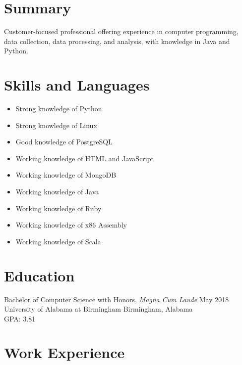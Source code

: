 \documentclass[10pt]{setzer_resume}
\begin{document}


  \section{Summary}
  Customer-focused professional offering experience in computer programming, data collection, data processing, and analysis, with knowledge in Java and Python.

  \section{Skills and Languages}

  {
  \setlength\multicolsep{0pt}
  \begin{multicols}{2}
    \noindent
    \begin{itemize}[nosep]
      \item Strong knowledge of Python
      \item Strong knowledge of Linux
      \item Good knowledge of PostgreSQL
      \item Working knowledge of HTML and JavaScript
      \item Working knowledge of MongoDB
      \item Working knowledge of Java
      \item Working knowledge of Ruby
      \item Working knowledge of x86 Assembly
      \item Working knowledge of Scala
    \end{itemize}
  \end{multicols}
  }

  \section{Education}
  Bachelor of Computer Science with Honors, \textit{Magna Cum Laude} \hfill May 2018 \\
  University of Alabama at Birmingham \hfill Birmingham, Alabama \\
  GPA\@: 3.81

  \section{Work Experience}

\end{document}
